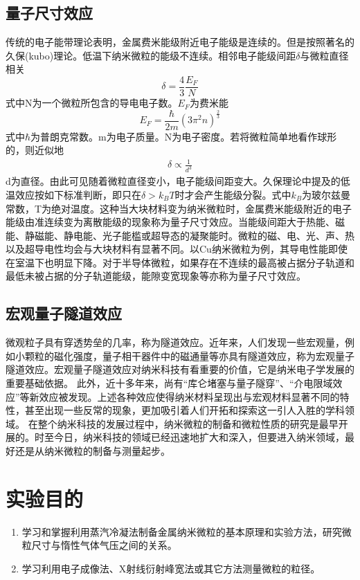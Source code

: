 \documentclass[a4paper]{article}
\begin{document}
\subsection{量子尺寸效应}
传统的电子能带理论表明，金属费米能级附近电子能级是连续的。但是按照著名的久保(kubo)理论。低温下纳米微粒的能级不连续。相邻电子能级间距$\delta$与微粒直径相关
\begin{equation}
\delta = \frac{4}{3}\frac{E_F}{N}\label{eq1}
\end{equation}
式中N为一个微粒所包含的导电电子数。$E_F$为费米能
\begin{equation}
E_F = \frac{\hbar}{2m}\left(3\pi^2n\right)^{\frac{2}{3}}\label{eq2}
\end{equation}
式中$\hbar$为普朗克常数。m为电子质量。N为电子密度。若将微粒简单地看作球形的，则近似地
\begin{eqnarray}
\delta \propto \frac{1}{d^3}\label{eq3}
\end{eqnarray}
d为直径。由此可见随着微粒直径变小，电子能级间距变大。久保理论中提及的低温效应按如下标准判断，即只在$\delta > k_BT$时才会产生能级分裂。式中$k_B$为玻尔兹曼常数，T为绝对温度。这种当大块材料变为纳米微粒时，金属费米能级附近的电子能级由准连续变为离散能级的现象称为量子尺寸效应。当能级间距大于热能、磁能、静磁能、静电能、光子能槛或超导态的凝聚能时。微粒的磁、电、光、声、热以及超导电性均会与大块材料有显著不同。以Cu纳米微粒为例，其导电性能即使在室温下也明显下降。对于半导体微粒，如果存在不连续的最高被占据分子轨道和最低未被占据的分子轨道能级，能隙变宽现象等亦称为量子尺寸效应。
\subsection{宏观量子隧道效应}
微观粒子具有穿透势垒的几率，称为隧道效应。近年来，人们发现一些宏观量，例如小颗粒的磁化强度，量子相干器件中的磁通量等亦具有隧道效应，称为宏观量子隧道效应。宏观量子隧道效应对纳米科技有看重要的价值，它是纳米电子学发展的重要基础依据。
此外，近十多年来，尚有“库仑堵塞与量子隧穿”、“介电限域效应”等新效应被发现。上述各种效应使得纳米材料呈现出与宏观材料显著不同的特性，甚至出现一些反常的现象，更加吸引着人们开拓和探索这一引人入胜的学科领域。
在整个纳米科技的发展过程中，纳米微粒的制备和微粒性质的研究是最早开展的。时至今日，纳米科技的领域已经迅速地扩大和深入，但要进入纳米领域，最好还是从纳米微粒的制备与测量起步。

\section{实验目的}
\begin{enumerate}
\item 学习和掌握利用蒸汽冷凝法制备金属纳米微粒的基本原理和实验方法，研究微粒尺寸与惰性气体气压之间的关系。
\item 学习利用电子成像法、X射线衍射峰宽法或其它方法测量微粒的粒径。
\end{enumerate}
\end{document}
